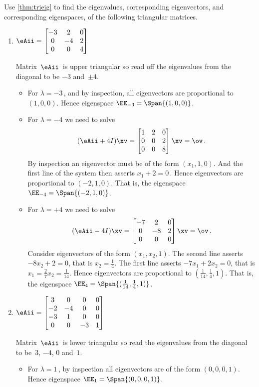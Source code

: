 \begin{example} \label{eg:trieig}
Use \autoref{thm:trieig} to find the eigenvalues, corresponding eigenvectors, and corresponding eigenspaces, of the following triangular matrices.
\begin{enumerate}
\item \(\eAii=\begin{bmatrix}-3&2&0
\\0&-4&2
\\0&0&4\end{bmatrix}\)
\begin{solution} 
Matrix~\(\eAii\)\ is upper triangular so read off the eigenvalues from the diagonal to be \(-3\) and~\(\pm 4\).
\begin{itemize}
\item For \(\lambda=-3\)\,, and by inspection, all eigenvectors are proportional to \((1,0,0)\).
Hence eigenspace \(\EE_{-3}=\Span\{(1,0,0)\}\).
\item For \(\lambda=-4\) we need to solve
\begin{equation*}
(\eAii+4I)\xv=
\begin{bmatrix}1&2&0
\\0&0&2
\\0&0&8\end{bmatrix}\xv=\ov\,.
\end{equation*}
By inspection an eigenvector must be of the form \((x_1,1,0)\).
And the first line of the system then asserts \(x_1+2=0\)\,.
Hence eigenvectors are proportional to \((-2,1,0)\).
That is, the eigenspace \(\EE_{-4}=\Span\{(-2,1,0)\}\).
\item For \(\lambda=+4\) we need to solve
\begin{equation*}
(\eAii-4I)\xv=
\begin{bmatrix}-7&2&0
\\0&-8&2
\\0&0&0\end{bmatrix}\xv=\ov\,.
\end{equation*}
Consider eigenvectors of the form \((x_1,x_2,1)\).
The second line asserts \(-8x_2+2=0\), that is \(x_2=\frac14\).
The first line asserts \(-7x_1+2x_2=0\), that is \(x_1=\frac27x_2=\frac1{14}\).
Hence eigenvectors are proportional to \((\frac1{14},\frac14,1)\).
That is, the eigenspace \(\EE_{4}=\Span\{(\frac1{14},\frac14,1)\}\).
\end{itemize}
\end{solution}

\item \(\eAii=\begin{bmatrix}3&0&0&0
\\-2&-4&0&0
\\-3&1&0&0
\\0&0&-3&1 \end{bmatrix}\)
\begin{solution} 
Matrix~\(\eAii\)\ is lower triangular so read the eigenvalues from the diagonal to be~\(3\), \(-4\), \(0\) and~\(1\).
\begin{itemize}
\item For \(\lambda=1\)\,, by inspection all eigenvectors are of the form \((0,0,0,1)\).
Hence eigenspace \(\EE_{1}=\Span\{(0,0,0,1)\}\).


\end{itemize}
\end{solution}
\end{enumerate}
\end{example}
